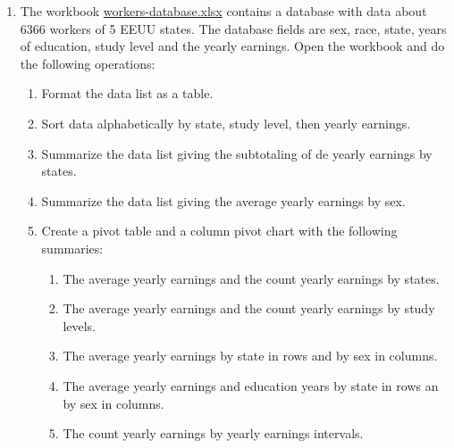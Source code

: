 \begin{enumerate}[leftmargin=*]
\item The workbook
\href{http://aprendeconalf.es/office/excel/exercises/databases/workers-database.xlsx}{\textsf{workers-database.xlsx}}
contains a database with data about 6366 workers of 5 EEUU states.
The database fields are sex, race, state, years of education, study level and the yearly earnings.
Open the workbook and do the following operations:
\begin{enumerate}
\item Format the data list as a table.
\item Sort data alphabetically by state, study level, then yearly earnings.
\item Summarize the data list giving the subtotaling of de yearly earnings by states. 
\item Summarize the data list giving the average yearly earnings by sex. 
\item Create a pivot table and a column pivot chart with the following summaries: 
\begin{enumerate}
\item The average yearly earnings and the count yearly earnings by states. 
\item The average yearly earnings and the count yearly earnings by study levels.
\item The average yearly earnings by state in rows and by sex in columns.
\item The average yearly earnings and education years by state in rows an by sex in columns.
\item The count yearly earnings by yearly earnings intervals.
\end{enumerate}
\end{enumerate}



\end{enumerate}
